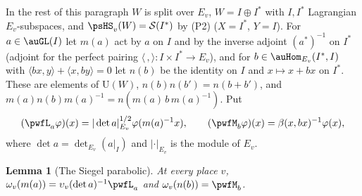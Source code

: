 \documentclass[10pt]{amsart}
\newtheorem{lemma}[theorem]{Lemma}
\theoremstyle{definition}
\theoremstyle{remark}
\providecommand{\auS}{\mathcal S}
\providecommand{\auU}{\mathrm U}
\begin{document}
In the rest of this paragraph $W$ is split over $E_v$, $W=I\oplus I^*$ with $I,I^*$ Lagrangian
$E_v$-subspaces, and $\psHS_v(W)=\auS(I^*)$ by (P2) ($X=I^*$, $Y=I$). For $a\in\auGL(I)$ let $m(a)$
act by $a$ on $I$ and by the inverse adjoint $(a^*)^{-1}$ on $I^*$ (adjoint for the perfect pairing
$\langle\,,\rangle\colon I\times I^*\to E_v$), and for $b\in\auHom_{E_v}(I^*,I)$ with
$\langle bx,y\rangle+\langle x,by\rangle=0$ let $n(b)$ be the identity on $I$ and $x\mapsto x+bx$ on
$I^*$. These are elements of $\auU(W)$, $n(b)n(b')=n(b+b')$, and $m(a)n(b)m(a)^{-1}=n(m(a)\,b\,
m(a)^{-1})$. Put
\[
(\pwfL_a\varphi)(x)=|\det a|_{E_v}^{1/2}\varphi(m(a)^{-1}x),\qquad(\pwfM_b\varphi)(x)=\beta(x,bx)^{-1}
\varphi(x),
\]
where $\det a=\det_{E_v}(a|_I)$ and $|\cdot|_{E_v}$ is the module of $E_v$.

\begin{lemma}[The Siegel parabolic]\label{pwf:siegel}
At every place $v$, $\omega_v(m(a))=\upsilon_v(\det a)^{-1}\pwfL_a$ and $\omega_v(n(b))=\pwfM_b$.
\end{lemma}
\end{document}
